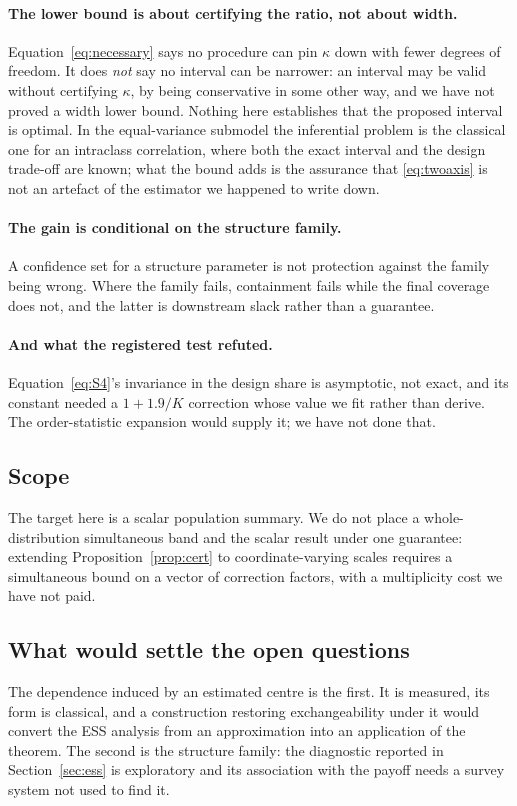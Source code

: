 \paragraph{The lower bound is about certifying the ratio, not about width.}
Equation~\eqref{eq:necessary} says no procedure can pin $\kappa$ down with fewer
degrees of freedom. It does \emph{not} say no interval can be narrower: an
interval may be valid without certifying $\kappa$, by being conservative in some
other way, and we have not proved a width lower bound. Nothing here establishes
that the proposed interval is optimal. In the equal-variance submodel the
inferential problem is the classical one for an intraclass correlation, where
both the exact interval and the design trade-off are known; what the bound adds
is the assurance that \eqref{eq:twoaxis} is not an artefact of the estimator we
happened to write down.

\paragraph{The gain is conditional on the structure family.} A confidence set for
a structure parameter is not protection against the family being wrong. Where the
family fails, containment fails while the final coverage does not, and the latter
is downstream slack rather than a guarantee.

\paragraph{And what the registered test refuted.} Equation~\eqref{eq:S4}'s
invariance in the design share is asymptotic, not exact, and its constant needed
a $1+1.9/K$ correction whose value we fit rather than derive. The order-statistic
expansion would supply it; we have not done that.

\subsection{Scope}

The target here is a scalar population summary. We do not place a
whole-distribution simultaneous band and the scalar result under one guarantee:
extending Proposition~\ref{prop:cert} to coordinate-varying scales requires a
simultaneous bound on a vector of correction factors, with a multiplicity cost we
have not paid.

\subsection{What would settle the open questions}

The dependence induced by an estimated centre is the first. It is measured, its
form is classical, and a construction restoring exchangeability under it would
convert the ESS analysis from an approximation into an application of the
theorem. The second is the structure family: the diagnostic reported in
Section~\ref{sec:ess} is exploratory and its association with the payoff needs a
survey system not used to find it.
